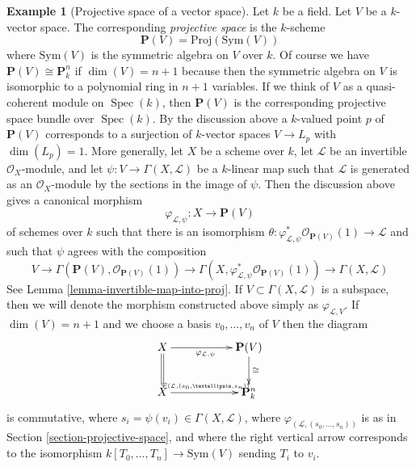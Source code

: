 \documentclass{stacks-project}
\theoremstyle{plain}
\theoremstyle{definition}
\newtheorem{example}[subsection]{Example}
\theoremstyle{remark}
\numberwithin{equation}{subsection}
\def\Spec{\mathop{\mathrm{Spec}}}
\begin{document}
\begin{example}[Projective space of a vector space]
\label{example-projective-space}
Let $k$ be a field. Let $V$ be a $k$-vector space. The corresponding
{\it projective space} is the $k$-scheme
$$
\mathbf{P}(V) = \text{Proj}(\text{Sym}(V))
$$
where $\text{Sym}(V)$ is the symmetric algebra on $V$ over $k$.
Of course we have $\mathbf{P}(V) \cong \mathbf{P}^n_k$ if $\dim(V) = n + 1$
because then the symmetric algebra on $V$ is isomorphic to a polynomial
ring in $n + 1$ variables. If we
think of $V$ as a quasi-coherent module on $\Spec(k)$, then $\mathbf{P}(V)$
is the corresponding projective space bundle over $\Spec(k)$. By the
discussion above a $k$-valued point $p$ of $\mathbf{P}(V)$ corresponds to
a surjection of $k$-vector spaces $V \to L_p$ with $\dim(L_p) = 1$.
More generally, let $X$ be a scheme over $k$, let $\mathcal{L}$ be an
invertible $\mathcal{O}_X$-module, and let
$\psi : V \to \Gamma(X, \mathcal{L})$ be a $k$-linear map
such that $\mathcal{L}$ is generated as an $\mathcal{O}_X$-module
by the sections in the image of $\psi$. Then the discussion above
gives a canonical morphism
$$
\varphi_{\mathcal{L}, \psi} : X \longrightarrow \mathbf{P}(V)
$$
of schemes over $k$ such that there is an isomorphism
$\theta : \varphi_{\mathcal{L}, \psi}^*\mathcal{O}_{\mathbf{P}(V)}(1)
\to \mathcal{L}$ and such that $\psi$ agrees with the composition
$$
V \to
\Gamma(\mathbf{P}(V), \mathcal{O}_{\mathbf{P}(V)}(1))
\to
\Gamma(X, \varphi_{\mathcal{L}, \psi}^*\mathcal{O}_{\mathbf{P}(V)}(1))
\to
\Gamma(X, \mathcal{L})
$$
See Lemma \ref{lemma-invertible-map-into-proj}. If
$V \subset \Gamma(X, \mathcal{L})$ is a subspace, then we will
denote the morphism constructed above simply as
$\varphi_{\mathcal{L}, V}$.
If $\dim(V) = n + 1$ and we choose a basis $v_0, \ldots, v_n$ of $V$
then the diagram
$$
\xymatrix{
X \ar@{=}[d] \ar[rr]_{\varphi_{\mathcal{L}, \psi}} & &
\mathbf{P}(V) \ar[d]^{\cong} \\
X \ar[rr]^{\varphi_{(\mathcal{L}, (s_0, \ldots, s_n))}} & &
\mathbf{P}^n_k
}
$$
is commutative, where $s_i = \psi(v_i) \in \Gamma(X, \mathcal{L})$, where
$\varphi_{(\mathcal{L}, (s_0, \ldots, s_n))}$
is as in Section \ref{section-projective-space},
and where the right vertical arrow corresponds
to the isomorphism $k[T_0, \ldots, T_n] \to \text{Sym}(V)$ sending
$T_i$ to $v_i$.
\end{example}
\end{document}
